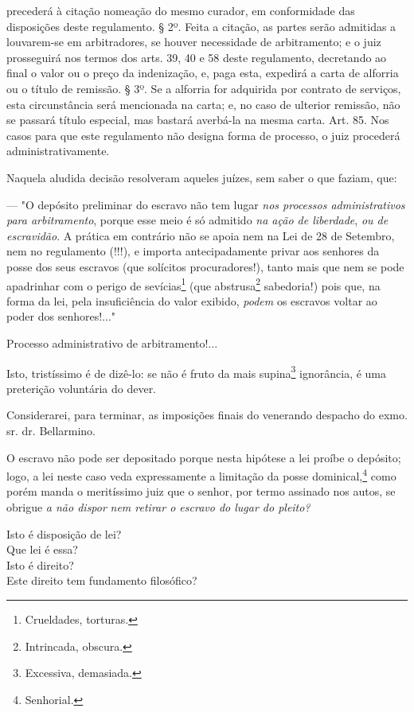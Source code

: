 {  precederá à citação nomeação do mesmo curador, em conformidade das
  disposições deste regulamento. § 2º. Feita a citação, as partes serão
  admitidas a louvarem-se em arbitradores, se houver necessidade de
  arbitramento; e o juiz prosseguirá nos termos dos arts. 39, 40 e 58
  deste regulamento, decretando ao final o valor ou o preço da
  indenização, e, paga esta, expedirá a carta de alforria ou o título de
  remissão. § 3º. Se a alforria for adquirida por contrato de serviços,
  esta circunstância será mencionada na carta; e, no caso de ulterior
  remissão, não se passará título especial, mas bastará averbá-la na
  mesma carta. Art. 85. Nos casos para que este regulamento não designa
  forma de processo, o juiz procederá administrativamente.}

Naquela aludida decisão resolveram aqueles juízes, sem saber o que
faziam, que:

--- "O depósito preliminar do escravo não tem lugar \emph{nos processos
administrativos para arbitramento}, porque esse meio é só admitido
\emph{na ação de liberdade}, \emph{ou de escravidão}. A prática em
contrário não se apoia nem na Lei de 28 de Setembro, nem no regulamento
(!!!), e importa antecipadamente privar aos senhores da posse dos seus
escravos (que solícitos procuradores!), tanto mais que nem se pode
apadrinhar com o perigo de sevícias\footnote{Crueldades, torturas.}
(que abstrusa\footnote{Intrincada, obscura.} sabedoria!) pois que, na
forma da lei, pela insuficiência do valor exibido, \emph{podem} os
escravos voltar ao poder dos senhores!..."

Processo administrativo de arbitramento!...

Isto, tristíssimo é de dizê-lo: se não é fruto da mais supina\footnote{
  Excessiva, demasiada.} ignorância, é uma preterição voluntária do
dever.

Considerarei, para terminar, as imposições finais do venerando despacho
do exmo. sr. dr. Bellarmino.

O escravo não pode ser depositado porque nesta hipótese a lei proíbe o
depósito; logo, a lei neste caso veda expressamente a limitação da posse
dominical,\footnote{Senhorial.} como porém manda o meritíssimo juiz
que o senhor, por termo assinado nos autos, se obrigue \emph{a não
dispor} \emph{nem retirar o escravo do lugar do pleito? }

Isto é disposição de lei?\\
Que lei é essa?\\
Isto é direito?\\
Este direito tem fundamento filosófico?

